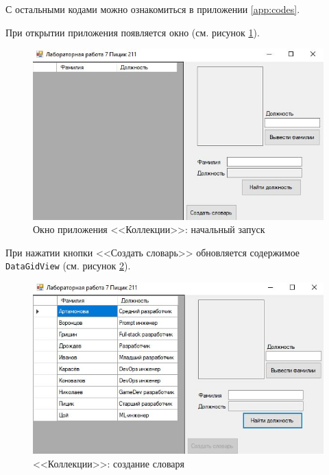 С остальными кодами можно ознакомиться в приложении \ref{app:codes}.

При открытии приложения появляется окно (см. рисунок \ref{fig:cols_res}).
\begin{figure}[H]
  \centering
  \includegraphics[scale=.85]{../img/collections/collections_res.jpg}
  \caption{Окно приложения <<Коллекции>>: начальный запуск}
  \label{fig:cols_res}
\end{figure}

При нажатии кнопки <<Создать словарь>> обновляется содержимое \newline \verb|DataGidView|
(см. рисунок \ref{fig:cols_create}).
\begin{figure}[H]
  \centering
  \includegraphics[scale=.85]{../img/collections/collections_create.jpg}
  \caption{<<Коллекции>>: создание словаря}
  \label{fig:cols_create}
\end{figure}

